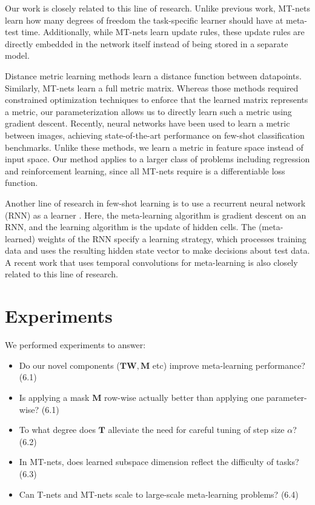 \documentclass{article}
\newcommand{\W}{\mathbf{W}}
\newcommand{\T}{\mathbf{T}}
\newcommand{\M}{\mathbf{M}}
\newcommand{\mask}{\M}
\begin{document}
Our work is closely related to this line of research.
Unlike previous work, MT-nets learn how many degrees of freedom the task-specific learner should have at meta-test time.
Additionally, while MT-nets learn update rules, these update rules are directly embedded in the network itself instead of being stored in a separate model.

Distance metric learning \cite{XingEP2002nips, WeinbergerKQ2005nips} methods learn a distance function between datapoints.
Similarly, MT-nets learn a full metric matrix.
Whereas those methods required constrained optimization techniques to enforce that the learned matrix represents a metric,
our parameterization allows us to directly learn such a metric using gradient descent.
Recently, neural networks have been used to learn a metric between images\cite{KochG2015icml, VinyalsO2016nips, SnellJ2017nips},
achieving state-of-the-art performance on few-shot classification benchmarks.
Unlike these methods, we learn a metric in feature space instead of input space.
Our method applies to a larger class of problems including regression and reinforcement learning, since all MT-nets require is a differentiable loss function.

Another line of research in few-shot learning is to use a recurrent neural network (RNN) as a learner \cite{SantoroA2016icml, MunkhdalaiT2017icml}.
Here, the meta-learning algorithm is gradient descent on an RNN, and the learning algorithm is the update of hidden cells.
The (meta-learned) weights of the RNN specify a learning strategy, which processes training data and uses the resulting hidden state vector to make decisions about test data.
A recent work that uses temporal convolutions for meta-learning\cite{Mishra2018iclr} is also closely related to this line of research.

\iffalse
The concept of fast weights\cite{fast} is also related to our method.
The idea here is that in addition to ordinary (slow) weights, having fast weights that rapidly activate and decay can result in robust yet adaptive learning.
This paper gives some evidence from physiology which suggests that similar mechanisms are inside the human brain as well.
\fi


\section{Experiments}
We performed experiments to answer:
\begin{itemize}
\setlength\itemsep{0em}
	\item Do our novel components ($\T \W, \mask$ etc) improve meta-learning performance? (6.1)
	\item Is applying a mask $\mask$ row-wise actually better than applying one parameter-wise? (6.1)
	\item To what degree does $\T$ alleviate the need for careful tuning of step size $\alpha$? (6.2)
	\item In MT-nets, does learned subspace dimension reflect the difficulty of tasks? (6.3)
	\item Can T-nets and MT-nets scale to large-scale meta-learning problems? (6.4)
\end{itemize}
\end{document}
